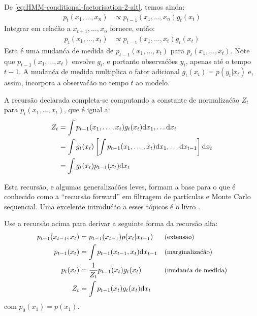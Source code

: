 \begin{exenumerate}
\begin{solution}
        De \eqref{eq:HMM-conditional-factorisation-2-alt}, temos ainda:
        \begin{align}
            p_t(x_1, \ldots, x_n) & \propto  p_{t-1}(x_1, \ldots, x_n) g_t(x_t)
        \end{align}
        Integrar em rela\'c\~ao a $x_{t+1}, \ldots, x_n$ fornece, ent\~ao:
        \begin{align}
            p_t(x_1, \ldots, x_t) & \propto  p_{t-1}(x_1, \ldots, x_t) g_t(x_t)
        \end{align}
        Esta \'e uma mudan\'ca de medida de $p_{t-1}(x_1, \ldots, x_t)$ para
        $p_t(x_1, \ldots, x_t)$. Note que $p_{t-1}(x_1, \ldots, x_t)$ envolve
        $g_i$, e portanto observa\'c\~oes $y_i$, apenas at\'e o tempo $t-1$. A
        mudan\'ca de medida multiplica o fator adicional
        $g_t(x_t)=p(y_t|x_t)$ e, assim, incorpora a observa\'c\~ao no tempo $t$
        ao modelo.
        
        A recurs\~ao declarada completa-se computando a constante de normaliza\'c\~ao $Z_t$ para
        $p_t(x_1, \ldots, x_t)$, que \'e igual a:
        \begin{align}
            Z_t & = \int  p_{t-1}(x_1, \ldots, x_t) g_t(x_t) \mathrm{d} x_1, \ldots \mathrm{d} x_t\\
            & = \int g_t(x_t) \left[\int p_{t-1}(x_1, \ldots, x_t) \mathrm{d} x_1, \ldots \mathrm{d} x_{t-1} \right] \mathrm{d} x_t\\
            & = \int g_t(x_t) p_{t-1}(x_t) \mathrm{d} x_t
        \end{align}
        
        Esta recurs\~ao, e algumas generaliza\'c\~oes leves, formam a base
        para o que \'e conhecido como a ``recurs\~ao forward'' em filtragem
        de part\'iculas e Monte Carlo sequencial. Uma excelente introdu\'c\~ao a
        esses t\'opicos \'e o livro \citep{Chopin2020}.
        
    \end{solution}
    
    \item Use a recurs\~ao acima para derivar a seguinte forma da recurs\~ao alfa: 
    \begin{align}
        p_{t-1}(x_{t-1}, x_t) &= p_{t-1}(x_{t-1}) p(x_t|x_{t-1}) && \text{\small (extens\~ao)} \\
        p_{t-1}(x_t) & = \int  p_{t-1}(x_{t-1}, x_t) \ud x_{t-1} &&\text{\small (marginaliza\'c\~ao)}\\
        p_{t}(x_t) &= \frac{1}{Z_t} p_{t-1}(x_t) g_t(x_t)  &&\text{\small (mudan\'ca de medida)}\\
        Z_t & = \int p_{t-1}(x_t) g_t(x_t) \ud x_t
    \end{align}
    com $p_0(x_1) = p(x_1)$.
    

\end{exenumerate}
